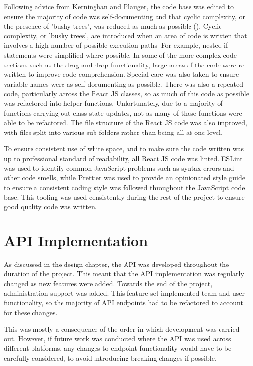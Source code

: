 \documentclass[l4proj.tex]{subfiles}
\begin{document}
 Following advice from Kerninghan and Plauger, the code base was edited to ensure the majority of code was self-documenting and that cyclic complexity, or the presence of 'bushy trees', was reduced as much as possible (\cite{Kernignhan1974}). Cyclic complexity, or 'bushy trees', are introduced when an area of code is written that involves a high number of possible execution paths. For example, nested if statements were simplified where possible. In some of the more complex code sections such as the drag and drop functionality, large areas of the code were re-written to improve code comprehension. Special care was also taken to ensure variable names were as self-documenting as possible. There was also a repeated code, particularly across the React JS classes, so as much of this code as possible was refactored into helper functions. Unfortunately, due to a majority of functions carrying out class state updates, not as many of these functions were able to be refactored. The file structure of the React JS code was also improved, with files split into various sub-folders rather than being all at one level. 

 To ensure consistent use of white space, and to make sure the code written was up to professional standard of readability, all React JS code was linted. ESLint was used to identify common JavaScript problems such as syntax errors and other code smells, while Prettier was used to provide an opinionated style guide to ensure a consistent coding style was followed throughout the JavaScript code base. This tooling was used consistently during the rest of the project to ensure good quality code was written.


\section{API Implementation}
As discussed in the design chapter, the API was developed throughout the duration of the project. This meant that the API implementation was regularly changed as new features were added. Towards the end of the project, administration support was added. This feature set implemented team and user functionality, so the majority of API endpoints had to be refactored to account for these changes. 

This was mostly a consequence of the order in which development was carried out. However, if future work was conducted where the API was used across different platforms, any changes to endpoint functionality would have to be carefully considered, to avoid introducing breaking changes if possible.
\end{document}

